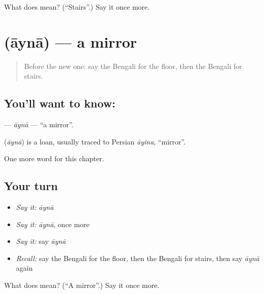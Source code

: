 \begin{tcolorbox}[breakable,colback=teal!4,colframe=teal!35!black,title={Before you move on}]
What does  mean? (\textquotedblleft{}Stairs\textquotedblright{}.) Say it once more.
\end{tcolorbox}
\section[\texorpdfstring{\bn{আয়না} (āynā)}{আয়না (āynā)}]{ (āynā) — a mirror}

\label{lesson:BN-C61-ayna}



\begin{quote}
Before the new one: say the Bengali for the floor, then the Bengali for stairs.
\end{quote}

\subsection*{You'll want to know: }
\textbf{} — \emph{āynā} — \textquotedblleft{}a mirror\textquotedblright{}.

\begin{cousinweb}
\textbf{} (\emph{āynā}) is a loan, usually traced to Persian \emph{āyina}, \textquotedblleft{}mirror\textquotedblright{}.
\end{cousinweb}

\begin{grammarlens}[title={What you've built}]
One more word for this chapter.
\end{grammarlens}

\subsection*{Your turn}
\begin{itemize}
\raggedright
  \item \emph{Say it:} \emph{āynā}
  \item \emph{Say it:} \emph{āynā}, once more
  \item \emph{Say it:} say \emph{āynā}
  \item \emph{Recall:} say the Bengali for the floor, then the Bengali for stairs, then say \emph{āynā} again
\end{itemize}

\begin{tcolorbox}[breakable,colback=teal!4,colframe=teal!35!black,title={Before you move on}]
What does  mean? (\textquotedblleft{}A mirror\textquotedblright{}.) Say it once more.
\end{tcolorbox}
